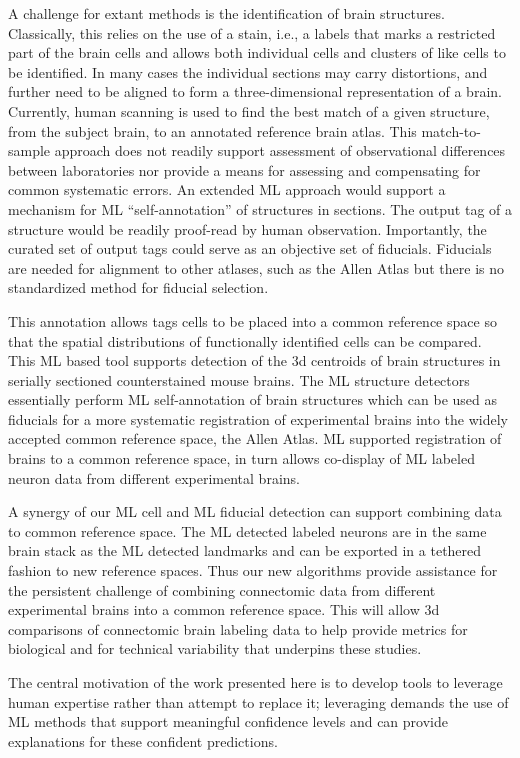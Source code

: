 \documentclass[11pt]{article}
\begin{document}
A challenge for extant methods is the
identification of brain structures. Classically, this relies on the
use of a stain, i.e., a labels that marks a restricted part of the
brain cells and allows both individual cells and clusters of like
cells to be identified. In many cases the individual sections may
carry distortions, and further need to be aligned to form a
three-dimensional representation of a brain. Currently, human scanning
is used to find the best match of a given structure, from the subject
brain, to an annotated reference brain atlas. This match-to-sample
approach does not readily support assessment of observational
differences between laboratories nor provide a means for assessing and
compensating for common systematic errors. An extended ML approach
would support a mechanism for ML “self-annotation” of structures in
sections. The output tag of a structure would be readily proof-read by
human observation. Importantly, the curated set of output tags could
serve as an objective set of fiducials. Fiducials are needed for
alignment to other atlases, such as the Allen Atlas but there is no
standardized method for fiducial selection.

This annotation allows tags cells to be placed into a common reference
space so that the spatial distributions of functionally identified
cells can be compared. This ML based tool supports detection of the 3d
centroids of brain structures in serially sectioned counterstained
mouse brains. The ML structure detectors essentially perform ML
self-annotation of brain structures which can be used as fiducials for
a more systematic registration of experimental brains into the widely
accepted common reference space, the Allen Atlas. ML supported
registration of brains to a common reference space, in turn allows
co-display of ML labeled neuron data from different experimental
brains.

A synergy of our ML cell and ML fiducial detection can support
combining data to common reference space. The ML detected labeled
neurons are in the same brain stack as the ML detected landmarks and
can be exported in a tethered fashion to new reference spaces. Thus
our new algorithms provide assistance for the persistent challenge of
combining connectomic data from different experimental brains into a
common reference space. This will allow 3d comparisons of connectomic
brain labeling data to help provide metrics for biological and for
technical variability that underpins these studies.

The central motivation of the work presented here is to develop tools
to leverage human expertise rather than attempt to replace it;
leveraging demands the use of ML methods that support meaningful
confidence levels and can provide explanations for these confident
predictions.

 
 
\end{document}
